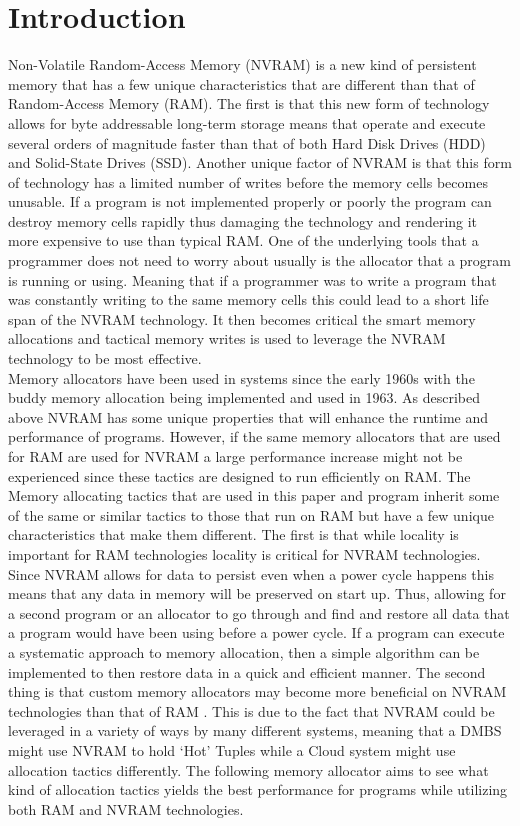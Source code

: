 \documentclass[conference]{IEEEtran}
\begin{document}
\section{Introduction}
Non-Volatile Random-Access Memory (NVRAM) is a new kind of persistent memory that has a few unique characteristics that are different than that of Random-Access Memory (RAM).  The first is that this new form of technology allows for byte addressable long-term storage means that operate and execute several orders of magnitude faster than that of both Hard Disk Drives (HDD) and Solid-State Drives (SSD). Another unique factor of NVRAM is that this form of technology has a limited number of writes before the memory cells becomes unusable. If a program is not implemented properly or poorly the program can destroy memory cells rapidly thus damaging the technology and rendering it more expensive to use than typical RAM. One of the underlying tools that a programmer does not need to worry about usually is the allocator that a program is running or using.  Meaning that if a programmer was to write a program that was constantly writing to the same memory cells this could lead to a short life span of the NVRAM technology. It then becomes critical the smart memory allocations and tactical memory writes is used to leverage the NVRAM technology to be most effective. 
\\
Memory allocators have been used in systems since the early 1960s with the buddy memory allocation being implemented and used in 1963. As described above NVRAM has some unique properties that will enhance the runtime and performance of programs. However, if the same memory allocators that are used for RAM are used for NVRAM a large performance increase might not be experienced since these tactics are designed to run efficiently on RAM. The Memory allocating tactics that are used in this paper and program inherit some of the same or similar tactics to those that run on RAM but have a few unique characteristics that make them different. The first is that while locality is important for RAM technologies locality is critical for NVRAM technologies. Since NVRAM allows for data to persist even when a power cycle happens this means that any data in memory will be preserved on start up. Thus, allowing for a second program or an allocator to go through and find and restore all data that a program would have been using before a power cycle.  If a program can execute a systematic approach to memory allocation, then a simple algorithm can be implemented to then restore data in a quick and efficient manner. The second thing is that custom memory allocators may become more beneficial on NVRAM technologies than that of RAM \cite{berger-oopsla-2002}. This is due to the fact that NVRAM could be leveraged in a variety of ways by many different systems, meaning that a DMBS might use NVRAM to hold ‘Hot’ Tuples while a Cloud system might use allocation tactics differently.  The following memory allocator aims to see what kind of allocation tactics yields the best performance for programs while utilizing both RAM and NVRAM technologies. 
\end{document}
